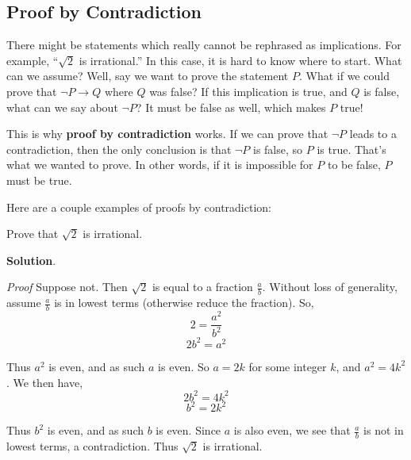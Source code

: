 \documentclass[11pt,]{book}
\makeatletter
\newcommand{\terminology}[1]{\textbf{#1}}
\theoremstyle{ptxplainnotitle}
\theoremstyle{ptxplaintitle}
\renewcommand*{\proofname}{Proof}
\renewenvironment{proof}[1][\proofname]{\par
  \pushQED{\qed}%
  \normalfont \topsep6\p@\@plus6\p@\relax
  \trivlist
  \item\relax
    {\itshape
    #1\@addpunct{.}}\hspace\labelsep\ignorespaces
}{%
  \popQED\endtrivlist\@endpefalse
}
\theoremstyle{ptxdefinitionnotitle}
\theoremstyle{ptxdefinitiontitle}
\theoremstyle{ptxdefinitionnotitle}
\theoremstyle{ptxdefinitiontitle}
\theoremstyle{ptxdefinitionnotitle}
\theoremstyle{ptxdefinitiontitle}
\theoremstyle{ptxdefinitiontitlenonumber}
\theoremstyle{ptxdefinitiontitlenonumber}
\numberwithin{equation}{chapter}
\newcommand{\imp}{\rightarrow}
\makeatother
\begin{document}
\subsection[{Proof by Contradiction}]{Proof by Contradiction}\label{subsection-24}
\hypertarget{p-2422}{}%
%
\par
\hypertarget{p-2423}{}%
There might be statements which really cannot be rephrased as implications. For example, ``\(\sqrt 2\) is irrational.'' In this case, it is hard to know where to start. What can we assume? Well, say we want to prove the statement \(P\). What if we could prove that \(\neg P \imp Q\) where \(Q\) was false? If this implication is true, and \(Q\) is false, what can we say about \(\neg P\)? It must be false as well, which makes \(P\) true!%
\par
\hypertarget{p-2424}{}%
This is why \terminology{proof by contradiction} works. If we can prove that \(\neg P\) leads to a contradiction, then the only conclusion is that \(\neg P\) is false, so \(P\) is true. That's what we wanted to prove. In other words, if it is impossible for \(P\) to be false, \(P\) must be true.%
\par
\hypertarget{p-2425}{}%
Here are a couple examples of proofs by contradiction:%
\begin{example}\label{example-68}
\hypertarget{p-2426}{}%
Prove that \(\sqrt{2}\) is irrational.%
\par\smallskip%
\noindent\textbf{Solution}.\hypertarget{solution-251}{}\quad%
\begin{proof}\hypertarget{proof-27}{}
\hypertarget{p-2427}{}%
Suppose not. Then \(\sqrt 2\) is equal to a fraction \(\frac{a}{b}\). Without loss of generality, assume \(\frac{a}{b}\) is in lowest terms (otherwise reduce the fraction). So,%
\begin{equation*}
2 = \frac{a^2}{b^2}
\end{equation*}
%
\begin{equation*}
2b^2 = a^2
\end{equation*}
%
\par
\hypertarget{p-2428}{}%
Thus \(a^2\) is even, and as such \(a\) is even. So \(a = 2k\) for some integer \(k\), and \(a^2 = 4k^2\). We then have,%
\begin{equation*}
2b^2 = 4k^2
\end{equation*}
%
\begin{equation*}
b^2 = 2k^2
\end{equation*}
%
\par
\hypertarget{p-2429}{}%
Thus \(b^2\) is even, and as such \(b\) is even. Since \(a\) is also even, we see that \(\frac{a}{b}\) is not in lowest terms, a contradiction. Thus \(\sqrt 2\) is irrational.%
\end{proof}
\end{example}
\end{document}
